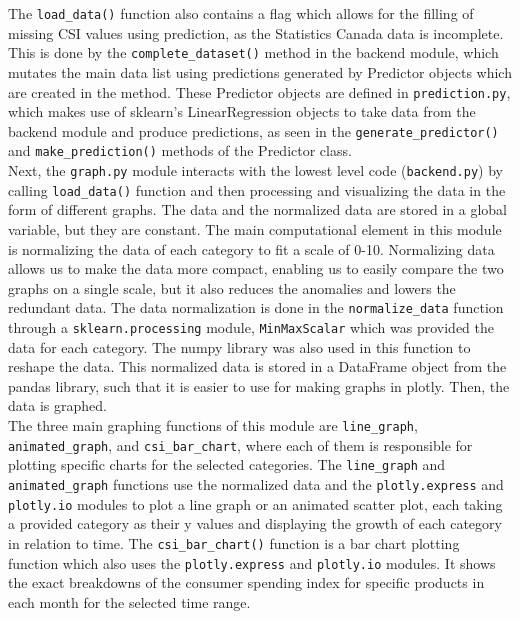 \documentclass[fontsize=11pt]{article}
\begin{document}
\tab The \texttt{load\_data()} function also contains a flag which allows for the filling of missing CSI values using prediction, as the Statistics Canada data is incomplete. This is done by the \texttt{complete\_dataset()} method in the backend module, which mutates the main data list using predictions generated by Predictor objects which are created in the method. These Predictor objects are defined in \texttt{prediction.py}, which makes use of sklearn's LinearRegression objects to take data from the backend module and produce predictions, as seen in the \texttt{generate\_predictor()} and \texttt{make\_prediction()} methods of the Predictor class.\\

\tab Next, the \texttt{graph.py} module interacts with the lowest level code (\texttt{backend.py}) by calling \texttt{load\_data()} function and then processing and visualizing the data in the form of different graphs. The data and the normalized data are stored in a global variable, but they are constant. The main computational element in this module is normalizing the data of each category to fit a scale of 0-10. Normalizing data allows us to make the data more compact, enabling us to easily compare the two graphs on a single scale, but it also reduces the anomalies and lowers the redundant data. The data normalization is done in the \texttt{normalize\_data} function through a \texttt{sklearn.processing} module, \texttt{MinMaxScalar} which was provided the data for each category. The numpy library was also used in this function to reshape the data. This normalized data is stored in a DataFrame object from the pandas library, such that it is easier to use for making graphs in plotly. Then, the data is graphed.\\

\tab The three main graphing functions of this module are \texttt{line\_graph}, \texttt{animated\_graph}, and \texttt{csi\_bar\_chart}, where each of them is responsible for plotting specific charts for the selected categories. The \texttt{line\_graph} and \texttt{animated\_graph} functions use the normalized data and the \texttt{plotly.express} and \texttt{plotly.io} modules to plot a line graph or an animated scatter plot, each taking a provided category as their y values and displaying the growth of each category in relation to time. The \texttt{csi\_bar\_chart()} function is a bar chart plotting function which also uses the \texttt{plotly.express} and \texttt{plotly.io} modules. It shows the exact breakdowns of the consumer spending index for specific products in each month for the selected time range.\\
\end{document}
